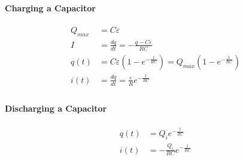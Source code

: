 \hrulefill

\paragraph*{Charging a Capacitor}

\begin{align*}
    Q_{max} &= C\varepsilon\\
    I &= \frac{dq}{dt} = -\frac{q-C\varepsilon}{RC}\\
    q(t) &= C\varepsilon(1-e^{-\frac{t}{RC}}) = Q_{max}(1-e^{-\frac{t}{RC}})\\
    i(t) &= \frac{dq}{dt} = \frac{\varepsilon}{R}e^{-\frac{t}{RC}}\\
\end{align*}


\paragraph*{Discharging a Capacitor}
\begin{align*}
    q(t) &= Q_ie^{-\frac{t}{RC}}\\
    i(t) &= -\frac{Q_i}{RC}e^{-\frac{t}{RC}}\\
\end{align*}

